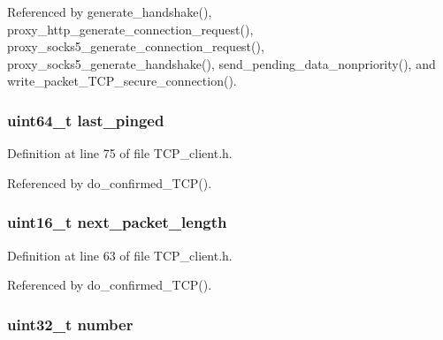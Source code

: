 Referenced by generate\+\_\+handshake(), proxy\+\_\+http\+\_\+generate\+\_\+connection\+\_\+request(), proxy\+\_\+socks5\+\_\+generate\+\_\+connection\+\_\+request(), proxy\+\_\+socks5\+\_\+generate\+\_\+handshake(), send\+\_\+pending\+\_\+data\+\_\+nonpriority(), and write\+\_\+packet\+\_\+\+T\+C\+P\+\_\+secure\+\_\+connection().

\hypertarget{struct_t_c_p___client___connection_a4049204f6c392628d31be6c39f03e031}{
\subsubsection[{last\+\_\+pinged}]{\setlength{\rightskip}{0pt plus 5cm}uint64\+\_\+t last\+\_\+pinged}}\label{struct_t_c_p___client___connection_a4049204f6c392628d31be6c39f03e031}


Definition at line 75 of file T\+C\+P\+\_\+client.\+h.



Referenced by do\+\_\+confirmed\+\_\+\+T\+C\+P().

\hypertarget{struct_t_c_p___client___connection_a1d1e3047af3c935db36ae7b2360aaec7}{
\subsubsection[{next\+\_\+packet\+\_\+length}]{\setlength{\rightskip}{0pt plus 5cm}uint16\+\_\+t next\+\_\+packet\+\_\+length}}\label{struct_t_c_p___client___connection_a1d1e3047af3c935db36ae7b2360aaec7}


Definition at line 63 of file T\+C\+P\+\_\+client.\+h.



Referenced by do\+\_\+confirmed\+\_\+\+T\+C\+P().

\hypertarget{struct_t_c_p___client___connection_ad50c630d233a71112a7df136970caefc}{
\subsubsection[{number}]{\setlength{\rightskip}{0pt plus 5cm}uint32\+\_\+t number}}\label{struct_t_c_p___client___connection_ad50c630d233a71112a7df136970caefc}


